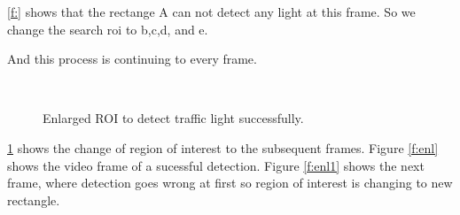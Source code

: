 \ref{f:} shows that the rectange A can not detect any light at this frame.
So we change the search roi to b,c,d, and e. 

And this process is continuing to every frame.

\begin{figure}[!ht]
\centering
{}\\

\caption{Enlarged ROI to detect traffic light successfully.}
\label{f:rec_enl}
\end{figure}

\ref{f:rec_enl} shows the change of region of interest to the subsequent frames.
Figure \ref{f:enl} shows the video frame of a sucessful detection.
Figure \ref{f:enl1} shows the next frame, where detection goes wrong at first so region of interest is changing to new rectangle.



